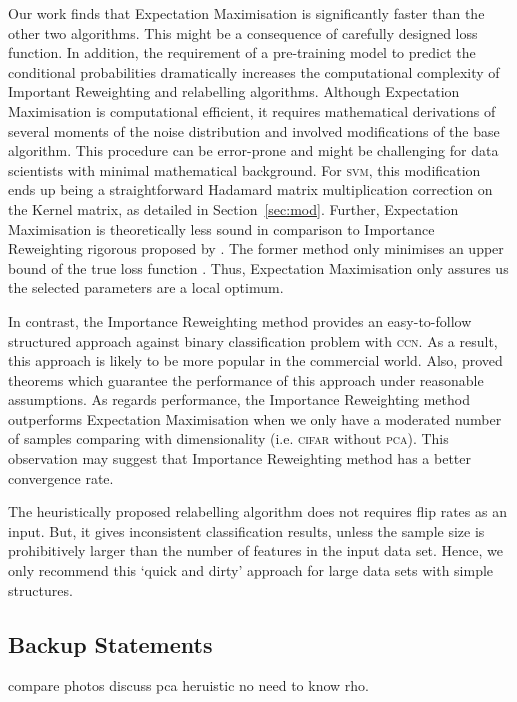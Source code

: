 \documentclass[12pt]{article} %
\newcommand{\svm}{\textsc{svm}}
\begin{document}
Our work finds that Expectation Maximisation is significantly faster than the other two algorithms. This might be a consequence of carefully designed loss function. In addition, the requirement of a pre-training model to predict the conditional probabilities dramatically increases the computational complexity of Important Reweighting and relabelling algorithms. Although Expectation Maximisation is computational efficient, it requires mathematical derivations of several moments of the noise distribution and involved modifications of the base algorithm. This procedure can be error-prone and might be challenging for data scientists with minimal mathematical background. For \svm , this modification ends up being a straightforward Hadamard matrix multiplication correction on the Kernel matrix, as detailed in Section~\ref{sec:mod}. Further, Expectation Maximisation is theoretically less sound in comparison to Importance Reweighting rigorous proposed by \citet{liu2016classification}. The former method only minimises an upper bound of the true loss function \citep{NIPS1999_1672}. Thus, Expectation Maximisation only assures us the selected parameters are a local optimum.

In contrast, the Importance Reweighting method provides an easy-to-follow structured approach against binary classification problem with \textsc{ccn}. As a result, this approach is likely to be more popular in the commercial world. Also, \citet{liu2016classification} proved theorems which guarantee the performance of this approach under reasonable assumptions. As regards performance, the Importance Reweighting method outperforms Expectation Maximisation when we only have a moderated number of samples comparing with dimensionality (i.e. \textsc{cifar} without \textsc{pca}). This observation may suggest that Importance Reweighting method has a better convergence rate. 

The heuristically proposed relabelling algorithm does not requires flip rates as an input. But, it gives inconsistent classification results, unless the sample size is prohibitively larger than the number of features in the input data set.  Hence, we only recommend this `quick and dirty' approach for large data sets with simple structures. 

\subsection{Backup Statements}
compare photos
discuss pca
heruistic no need to know rho.
\end{document}
